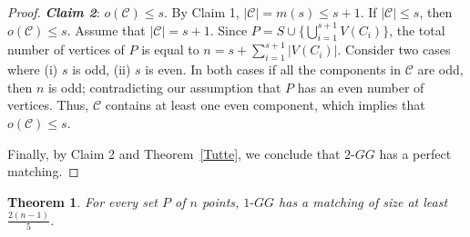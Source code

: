 \documentclass[11pt,a4paper]{article}
\newcommand{\kGG}[2]{$#1\text{-}GG#2$}
\newtheorem{theorem}{Theorem}
\begin{document}
\begin{proof}
{\bf \em Claim 2}: $o(\mathcal{C})\le s$. By Claim 1, $|\mathcal{C}|=m(s)\le s+1$. If $|\mathcal{C}|\le s$, then $o(\mathcal{C})\le s$. Assume that $|\mathcal{C}|=s+1$. Since $P=S\cup \{\bigcup^{s+1}_{i=1}{V(C_i)}\}$, the total number of vertices of $P$ is equal to $n=s+\sum_{i=1}^{s+1}{|V(C_i)|}$. Consider two cases where (i) $s$ is odd, (ii) $s$ is even. In both cases if all the components in $\mathcal{C}$ are odd, then $n$ is odd; contradicting our assumption that $P$ has an even number of vertices. Thus, $\mathcal{C}$ contains at least one even component, which implies that $o(\mathcal{C})\le s$.

Finally, by Claim 2 and Theorem~\ref{Tutte}, we conclude that \kGG{2}{} has a perfect matching.
\end{proof}

\begin{theorem}
\label{matching-1GG}
For every set $P$ of $n$ points, \kGG{1}{} has a matching of size at least $\frac{2(n-1)}{5}$.
\end{theorem}
\end{document}
